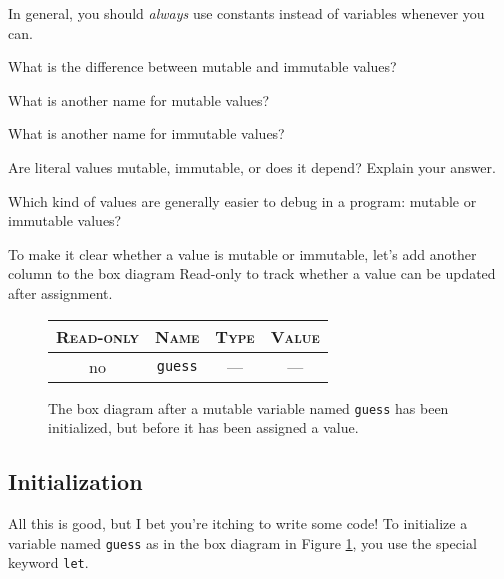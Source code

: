 \begin{center}
   In general, you should \emph{always} use constants instead of variables whenever you can.
\end{center}

\begin{question}
  What is the difference between mutable and immutable values?
\end{question}

\begin{question}
  What is another name for mutable values?
\end{question}

\begin{question}
  What is another name for immutable values?
\end{question}

\begin{question}
  Are literal values mutable, immutable, or does it depend? Explain your answer.
\end{question}

\begin{question}
  Which kind of values are generally easier to debug in a program: mutable or immutable values?
\end{question}

To make it clear whether a value is mutable or immutable, let's add another column to the box diagram \textsf{Read-only} to track whether a value can be updated after assignment.

\begin{figure}[h]
  \begin{tabular}{|c|c|c|c|}
    \hline
    \textsc{Read-only} & \textsc{Name} & \textsc{Type} & \textsc{Value}\\
    \hline
    no & \texttt{guess} & --- & ---\\
    \hline
  \end{tabular}
  \caption{\label{fig:intro-initialized-variable} The box diagram after a mutable variable named \texttt{guess} has been initialized, but before it has been assigned a value.}
\end{figure}

\subsection{Initialization}
All this is good, but I bet you're itching to write some code! To initialize a variable named \texttt{guess} as in the box diagram in Figure \ref{fig:intro-initialized-variable}, you use the special keyword \texttt{let}.

